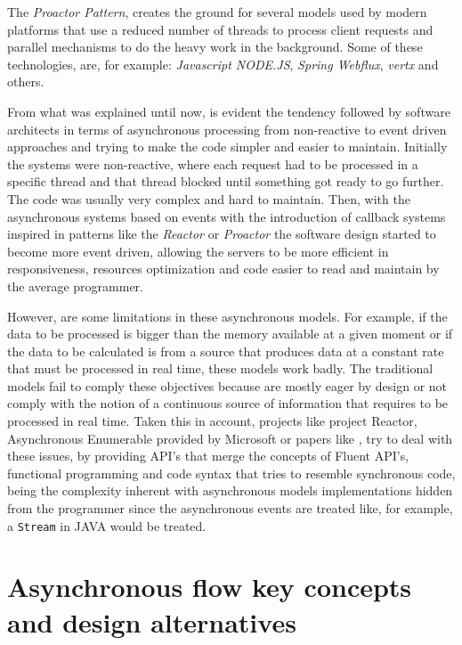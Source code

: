 The \textit{Proactor Pattern}, creates the ground for several models used by modern platforms that use a reduced number of threads to process client requests and parallel mechanisms to do the heavy work in the background. Some of these technologies, are, for example: \textit{Javascript NODE.JS}, \textit{Spring Webflux}, \textit{vertx} and others.

From what was explained until now, is evident the tendency followed by software architects in terms of asynchronous processing from non-reactive to event driven approaches and trying to make the code simpler and easier to maintain. Initially the systems were non-reactive, where each request had to be processed in a 
specific thread and that thread blocked until something got ready to go further. The code was usually very complex and hard to maintain. 
Then, with the asynchronous systems based on events with the introduction of callback systems inspired in patterns like the \textit{Reactor} or \textit{Proactor} the software design started to become more event driven, allowing the servers to be more efficient in responsiveness, resources optimization and code easier to read and maintain by the average programmer.

However, are some limitations in these asynchronous models. For example, if the data to be processed is bigger than the memory available at a given moment or if the data to be calculated is from a source that produces data at a constant rate that must be processed in real time, these models work badly.  
The traditional models fail to comply these objectives because are mostly eager by design or not comply with the notion of a continuous source of information that requires to be processed in real time.
Taken this in account, projects like project Reactor, Asynchronous Enumerable provided by Microsoft or papers like \cite{LAZYVSEAGER}, try to deal with these issues, by providing API's that merge the concepts of Fluent API's, functional programming and code syntax that tries to resemble synchronous code, being the complexity inherent with asynchronous models implementations hidden from the programmer since the asynchronous events are treated like, for example, a \texttt{Stream} in JAVA would be treated.

\clearpage



\section{Asynchronous flow key concepts and design alternatives} %
\label{sec:async_concepts}



